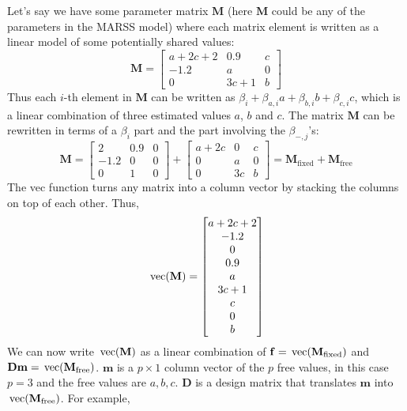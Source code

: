\documentclass[]{article}
\def\DD{\mbox{$\mathbf D$}}	\def\dd{\mbox{$\mathbf d$}}
\def\MM{\mbox{$\mathbf M$}}  \def\mm{\mbox{$\mathbf m$}}
\def\vec{\,\textup{\textrm{vec}}}
\begin{document}
Let's say we have some parameter matrix $\MM$ (here $\MM$ could be any of the parameters in the MARSS model) where each matrix element is written as a linear model of some potentially shared values:
\begin{equation*}
\MM=
\begin{bmatrix}
a+2c+2&0.9&c\\
-1.2&a&0\\
0&3c+1&b
\end{bmatrix}
\end{equation*}
Thus each $i$-th element in $\MM$ can be written as $\beta_i+\beta_{a,i} a + \beta_{b,i} b + \beta_{c,i} c$, which is a linear combination of three estimated values $a$, $b$ and $c$. The matrix $\MM$ can be rewritten in terms of a $\beta_i$ part and the part involving the $\beta_{-,j}$'s:
\begin{equation*}
\MM=	
\begin{bmatrix}
2&0.9&0\\
-1.2&0&0\\
0&1&0
\end{bmatrix}
+
\begin{bmatrix}
a+2c&0&c\\
0&a&0\\
0&3c&b
\end{bmatrix}
=\MM_\text{fixed}+\MM_\text{free}
\end{equation*}
The vec function turns any matrix into a column vector by stacking the columns on top of each other.  Thus,
\begin{equation*}
\vec(\MM)=
\begin{bmatrix}
a+2c+2\\
-1.2\\
0\\
0.9\\
a\\
3c+1\\
c\\
0\\
b
\end{bmatrix}	
\end{equation*}
We can now write $\vec(\MM)$ as a linear combination of $\ff = \vec(\MM_\text{fixed})$ and $\DD\mm = \vec(\MM_\text{free})$.  $\mm$ is a $p \times 1$ column vector of the $p$ free values, in this case $p=3$ and the free values are $a, b, c$. $\DD$ is a design matrix that translates $\mm$ into $\vec(\MM_\text{free})$.  For example,
\end{document}
